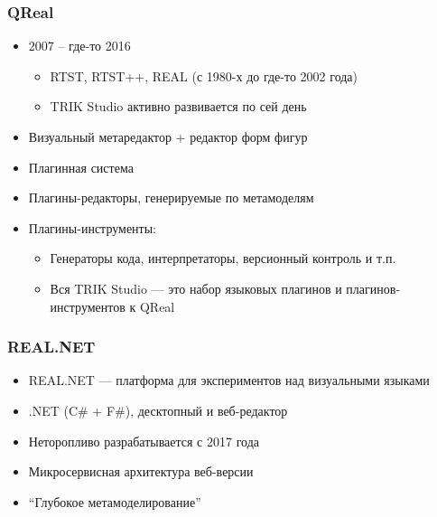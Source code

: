 \documentclass[xetex,mathserif,serif]{beamer}
\begin{document}
    \begin{frame}
        \frametitle{QReal}
        \begin{itemize}
            \item 2007 -- где-то 2016
            \begin{itemize}
                \item RTST, RTST++, REAL (с 1980-х до где-то 2002 года)
                \item TRIK Studio активно развивается по сей день
            \end{itemize}
            \item Визуальный метаредактор + редактор форм фигур
            \item Плагинная система
            \item Плагины-редакторы, генерируемые по метамоделям
            \item Плагины-инструменты:
            \begin{itemize}
                \item Генераторы кода, интерпретаторы, версионный контроль и т.п.
                \item Вся TRIK Studio --- это набор языковых плагинов и плагинов-инструментов к QReal
            \end{itemize}
        \end{itemize}
    \end{frame}

    \begin{frame}
        \frametitle{REAL.NET}
        \begin{itemize}
            \item REAL.NET --- платформа для экспериментов над визуальными языками
            \item .NET (C\# + F\#), десктопный и веб-редактор
            \item Неторопливо разрабатывается с 2017 года
            \item Микросервисная архитектура веб-версии
            \item ``Глубокое метамоделирование''
        \end{itemize}
    \end{frame}
\end{document}
